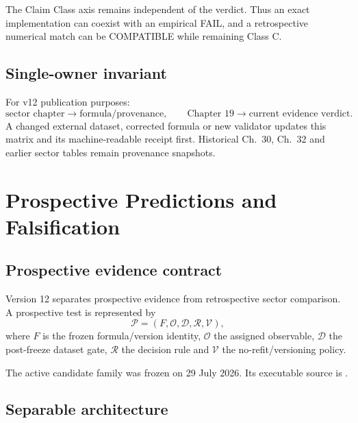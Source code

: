 \documentclass[11pt,a4paper,twoside]{book}
\theoremstyle{definition}
\begin{document}
The Claim Class axis remains independent of the verdict. Thus an exact implementation can coexist with an empirical FAIL, and a retrospective numerical match can be COMPATIBLE while remaining Class C.

\section{Single-owner invariant}

For v12 publication purposes:
\[
\boxed{
\text{sector chapter}\to\text{formula/provenance},
\qquad
\text{Chapter 19}\to\text{current evidence verdict}.
}
\]
A changed external dataset, corrected formula or new validator updates this matrix and its machine-readable receipt first. Historical Ch.~30, Ch.~32 and earlier sector tables remain provenance snapshots.

\clearpage

\chapter{Prospective Predictions and Falsification}
\label{ch:v12_predictions_falsification}

\section{Prospective evidence contract}

Version 12 separates prospective evidence from retrospective sector comparison. A prospective test is represented by
\begin{equation}
\boxed{
\mathcal P
=(F,\mathcal O,\mathcal D,\mathcal R,\mathcal V),
}
\end{equation}
where $F$ is the frozen formula/version identity, $\mathcal O$ the assigned observable, $\mathcal D$ the post-freeze dataset gate, $\mathcal R$ the decision rule and $\mathcal V$ the no-refit/versioning policy.

The active candidate family was frozen on 29 July 2026. Its executable source is
.

\section{Separable architecture}
\end{document}
